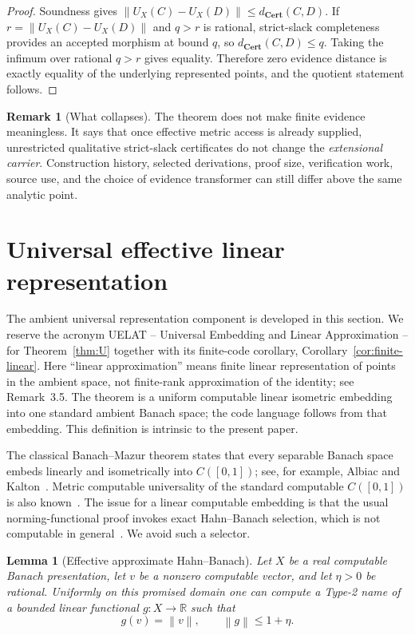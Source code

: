 \documentclass[11pt]{article}
\newtheorem{lemma}[theorem]{Lemma}
\theoremstyle{definition}
\newtheorem{remark}[theorem]{Remark}
\newcommand{\norm}[1]{\left\lVert #1 \right\rVert}
\newcommand{\R}{\mathbb{R}}
\newcommand{\Cert}{\mathbf{Cert}}
\begin{document}
\begin{proof}
Soundness gives $\norm{U_X(C)-U_X(D)}\le d_{\Cert}(C,D)$.  If
$r=\norm{U_X(C)-U_X(D)}$ and $q>r$ is rational, strict-slack completeness provides an
accepted morphism at bound $q$, so $d_{\Cert}(C,D)\le q$.  Taking the infimum over
rational $q>r$ gives equality.  Therefore zero evidence distance is exactly equality of
the underlying represented points, and the quotient statement follows.
\end{proof}

\begin{remark}[What collapses]
The theorem does not make finite evidence meaningless.  It says that once effective
metric access is already supplied, unrestricted qualitative strict-slack certificates do
not change the \emph{extensional carrier}.  Construction history, selected derivations,
proof size, verification work, source use, and the choice of evidence transformer can
still differ above the same analytic point.
\end{remark}

\section{Universal effective linear representation}\label{sec:universal}

The ambient universal representation component is developed in this section.  We reserve
the acronym UELAT -- Universal Embedding and Linear Approximation -- for
Theorem~\ref{thm:U} together with its finite-code corollary,
Corollary~\ref{cor:finite-linear}.  Here ``linear approximation'' means finite linear
representation of points in the ambient space, not finite-rank approximation of the
identity; see Remark~3.5.  The theorem is a uniform computable linear isometric embedding
into one standard ambient Banach space; the code language follows from that embedding.
This definition is intrinsic to the present paper.

The classical Banach--Mazur theorem states that every separable Banach space embeds linearly
and isometrically into $C([0,1])$; see, for example, Albiac and Kalton~\cite{AlbiacKalton}.
Metric computable universality of the standard computable $C([0,1])$ is also
known~\cite{BagavievEtAl,DowneyMelnikov}.  The issue for a linear computable embedding is
that the usual norming-functional proof invokes exact Hahn--Banach selection, which is not
computable in general~\cite{Brattka2008,BrattkaSorg2026}.  We avoid such a selector.

\begin{lemma}[Effective approximate Hahn--Banach]\label{lem:epsHB}
Let $X$ be a real computable Banach presentation, let $v$ be a nonzero computable vector,
and let $\eta>0$ be rational.  Uniformly on this promised domain one can compute a Type-2
name of a bounded linear functional $g:X\to\R$ such that
\[
 g(v)=\norm v,
 \qquad \norm g\le 1+\eta.
\]
\end{lemma}
\end{document}
